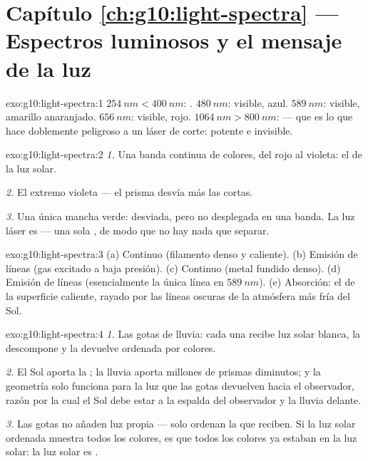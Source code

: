 \section*{Capítulo \ref{ch:g10:light-spectra} --- Espectros luminosos y el mensaje de la luz}

\begin{solution}{exo:g10:light-spectra:1}
$\qty{254}{nm} < \qty{400}{nm}$: . $\qty{480}{nm}$: visible,
azul. $\qty{589}{nm}$: visible, amarillo anaranjado. $\qty{656}{nm}$:
visible, rojo. $\qty{1064}{nm} > \qty{800}{nm}$:  --- que es
lo que hace doblemente peligroso a un láser de corte: potente e
invisible.
\end{solution}

\begin{solution}{exo:g10:light-spectra:2}
\emph{1.} Una banda continua de colores, del rojo al violeta: el
 de la luz solar.

\emph{2.} El extremo violeta --- el prisma desvía más las  cortas.

\emph{3.} Una única mancha verde: desviada, pero no desplegada en una
banda. La luz láser es  --- una sola , de
modo que no hay nada que separar.
\end{solution}

\begin{solution}{exo:g10:light-spectra:3}
(a) Continuo (filamento denso y caliente). (b) Emisión de líneas (gas
excitado a baja presión). (c) Continuo (metal fundido denso). (d)
Emisión de líneas (esencialmente la única línea en $\qty{589}{nm}$). (e)
Absorción: el  de la superficie caliente, rayado por
las líneas oscuras de la atmósfera más fría del Sol.
\end{solution}

\begin{solution}{exo:g10:light-spectra:4}
\emph{1.} Las gotas de lluvia: cada una recibe luz solar blanca, la
descompone y la devuelve ordenada por colores.

\emph{2.} El Sol aporta la ; la lluvia aporta millones de
prismas diminutos; y la geometría solo funciona para la luz que las
gotas devuelven hacia el observador, razón por la cual el Sol debe estar
a la espalda del observador y la lluvia delante.

\emph{3.} Las gotas no añaden luz propia --- solo ordenan la que
reciben. Si la luz solar ordenada muestra todos los colores, es que
todos los colores ya estaban en la luz solar: la luz solar es .
\end{solution}

